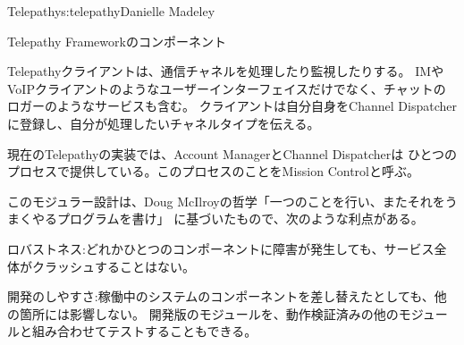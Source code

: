 \begin{aosachapter}{Telepathy}{s:telepathy}{Danielle Madeley}
\begin{aosasect1}{Telepathy Frameworkのコンポーネント}
\begin{aosaitemize}
  \item Telepathyクライアントは、通信チャネルを処理したり監視したりする。
  IMやVoIPクライアントのようなユーザーインターフェイスだけでなく、チャットのロガーのようなサービスも含む。
  クライアントは自分自身をChannel Dispatcherに登録し、自分が処理したいチャネルタイプを伝える。

\end{aosaitemize}

現在のTelepathyの実装では、Account ManagerとChannel Dispatcherは
ひとつのプロセスで提供している。このプロセスのことをMission Controlと呼ぶ。


このモジュラー設計は、Doug McIlroyの哲学「一つのことを行い、またそれをうまくやるプログラムを書け」
に基づいたもので、次のような利点がある。

\pagebreak

\begin{aosadescription}

  \item{ロバストネス:}どれかひとつのコンポーネントに障害が発生しても、サービス全体がクラッシュすることはない。

  \item{開発のしやすさ:}稼働中のシステムのコンポーネントを差し替えたとしても、他の箇所には影響しない。
  開発版のモジュールを、動作検証済みの他のモジュールと組み合わせてテストすることもできる。


\end{aosadescription}
\end{aosasect1}
\end{aosachapter}
